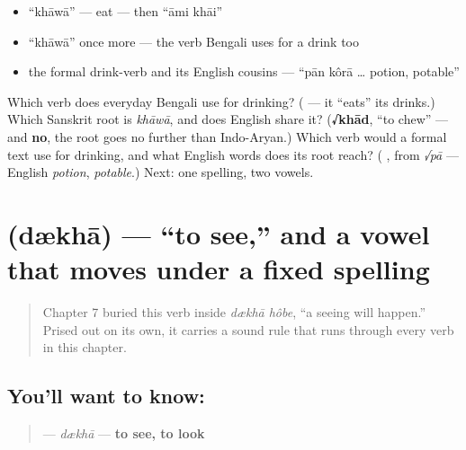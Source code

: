 \begin{itemize}
\raggedright
  \item \textquotedblleft{}khāwā\textquotedblright{} — eat — then \textquotedblleft{}āmi khāi\textquotedblright{}
  \item \textquotedblleft{}khāwā\textquotedblright{} once more — the verb Bengali uses for a drink too
  \item the formal drink-verb and its English cousins — \textquotedblleft{}pān kôrā … potion, potable\textquotedblright{}
\end{itemize}

\begin{tcolorbox}[breakable,colback=teal!4,colframe=teal!35!black,title={Before you move on}]
Which verb does everyday Bengali use for drinking? (\textbf{} — it \textquotedblleft{}eats\textquotedblright{} its drinks.) Which Sanskrit root is \emph{khāwā}, and does English share it? (\textbf{√khād}, \textquotedblleft{}to chew\textquotedblright{} — and \textbf{no}, the root goes no further than Indo-Aryan.) Which verb would a formal text use for drinking, and what English words does its root reach? (\textbf{ }, from \emph{√pā} — English \emph{potion}, \emph{potable}.) Next: one spelling, two vowels.
\end{tcolorbox}
\section[\texorpdfstring{\bn{দেখা} (dækhā)}{দেখা (dækhā)}]{ (dækhā) — \textquotedblleft{}to see,\textquotedblright{} and a vowel that moves under a fixed spelling}

\label{lesson:BN-C07-dekha}



\begin{quote}
Chapter 7 buried this verb inside \emph{dækhā hôbe}, \textquotedblleft{}a seeing will happen.\textquotedblright{} Prised out on its own, it carries a sound rule that runs through every verb in this chapter.
\end{quote}

\subsection*{You'll want to know: }
\begin{quote}
\textbf{} — \emph{dækhā} — \textbf{to see, to look}
\end{quote}

